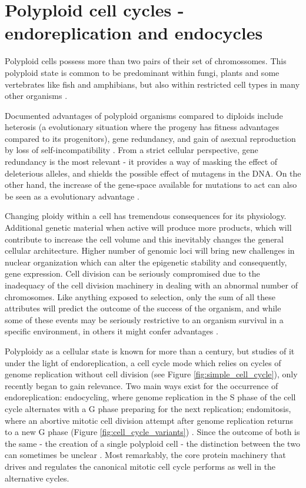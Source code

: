 \documentclass[11pt,twoside,a4paper]{report}
\begin{document}
	\section{Polyploid cell cycles - endoreplication and endocycles}
		Polyploid cells possess more than two pairs of their set of chromossomes. This polyploid state is common to be predominant within fungi, plants and some vertebrates like fish and amphibians, but also within restricted cell types in many other organisms \cite{Fox2013}.
		
		Documented advantages of polyploid organisms compared to diploids include heterosis (a evolutionary situation where the progeny has fitness advantages compared to its progenitors), gene redundancy, and gain of asexual reproduction by loss of self-incompatibility \cite{Comai2005}. From a strict cellular perspective, gene redundancy is the most relevant - it provides a way of masking the effect of deleterious alleles, and shields the possible effect of mutagens in the DNA. On the other hand, the increase of the gene-space available for mutations to act can also be seen as a evolutionary advantage \cite{Comai2005}.
		
		Changing ploidy within a cell has tremendous consequences for its physiology. Additional genetic material when active will produce more products, which will contribute to increase the cell volume and this inevitably changes the general cellular architecture. Higher number of genomic loci will bring new challenges in nuclear organization which can alter the epigenetic stability and consequently, gene expression. Cell division can be seriously compromised due to the inadequacy of the cell division machinery in dealing with an abnormal number of chromosomes. Like anything exposed to selection, only the sum of all these attributes will predict the outcome of the success of the organism, and while some of these events may be seriously restrictive to an organism survival in a specific environment, in others it might confer advantages \cite{Comai2005}\cite{Edgar2014}.
		
		Polyploidy as a cellular state is known for more than a century, but studies of it under the light of endoreplication, a cell cycle mode which relies on cycles of genome replication without cell division (see Figure \ref{fig:simple_cell_cycle}), only recently began to gain relevance. Two main ways exist for the occurrence of endoreplication: endocycling, where genome replication in the S phase of the cell cycle alternates with a G phase preparing for the next replication; endomitosis, where an abortive mitotic cell division attempt after genome replication returns to a new G phase (Figure \ref{fig:cell_cycle_variants}) \cite{Edgar2014}. Since the outcome of both is the same - the creation of a single polyploid cell - the distinction between the two can sometimes be unclear \cite{Fox2013}. Most remarkably, the core protein machinery that drives and regulates the canonical mitotic cell cycle performs as well in the alternative cycles.
		
\end{document}
